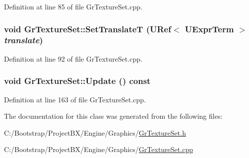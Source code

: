 Definition at line 85 of file GrTextureSet.cpp.\hypertarget{class_gr_texture_set_6f9329e6556add7e45782245aea5a827}{
\subsubsection[{SetTranslateT}]{\setlength{\rightskip}{0pt plus 5cm}void GrTextureSet::SetTranslateT ({\bf URef}$<$ {\bf UExprTerm} $>$ {\em translate})}}
\label{class_gr_texture_set_6f9329e6556add7e45782245aea5a827}




Definition at line 92 of file GrTextureSet.cpp.\hypertarget{class_gr_texture_set_771bfcf964c94d73241cc581b9c46835}{
\subsubsection[{Update}]{\setlength{\rightskip}{0pt plus 5cm}void GrTextureSet::Update () const}}
\label{class_gr_texture_set_771bfcf964c94d73241cc581b9c46835}




Definition at line 163 of file GrTextureSet.cpp.

The documentation for this class was generated from the following files:\begin{CompactItemize}
\item 
C:/Bootstrap/ProjectBX/Engine/Graphics/\hyperlink{_gr_texture_set_8h}{GrTextureSet.h}\item 
C:/Bootstrap/ProjectBX/Engine/Graphics/\hyperlink{_gr_texture_set_8cpp}{GrTextureSet.cpp}\end{CompactItemize}
